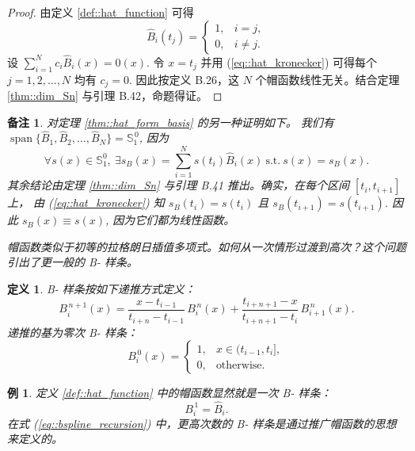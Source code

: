 \documentclass[a4paper]{ctexart}
\newtheorem{remark}{备注}
\newtheorem{definition}[theorem]{定义} %
\newtheorem{example}[theorem]{例}
\numberwithin{theorem}{section}
\numberwithin{equation}{section}
\numberwithin{figure}{section}
\numberwithin{remark}{section}
\begin{document}
\begin{proof}
由定义 \ref{def::hat_function} 可得
\begin{equation}
\label{eq::hat_kronecker}
\hat{B}_i(t_j)=
\begin{cases}
1, & i=j,\\
0, & i\ne j.
\end{cases}
\end{equation}
设 $\sum_{i=1}^{N} c_i \hat{B}_i(x)=0(x)$. 
令 $x=t_j$ 并用 (\ref{eq::hat_kronecker}) 可得每个 $j=1,2,\ldots,N$ 均有 $c_j=0$.
因此按定义 B.26，这 $N$ 个帽函数线性无关。结合定理 \ref{thm::dim_Sn} 与引理 B.42，命题得证。
\end{proof}

\begin{remark}
    \label{rem::alt_proof_hat_basis}
对定理 \ref{thm::hat_form_basis} 的另一种证明如下。
我们有 $\operatorname{span}\{\hat{B}_1,\hat{B}_2,\ldots,\hat{B}_N\}=\mathbb{S}^{\,0}_{1}$, 因为
\[
\forall s(x)\in \mathbb{S}^{0}_{1},\ \exists s_B(x)=\sum_{i=1}^{N} s(t_i)\hat{B}_i(x)\ \text{s.t.}\ s(x)=s_B(x).
\]
其余结论由定理 \ref{thm::dim_Sn} 与引理 B.41 推出。确实，在每个区间 $[t_i,t_{i+1}]$ 上，
由 (\ref{eq::hat_kronecker}) 知 $s_B(t_i)=s(t_i)$ 且 $s_B(t_{i+1})=s(t_{i+1})$. 因此 $s_B(x)\equiv s(x)$, 
因为它们都为线性函数。

帽函数类似于初等的拉格朗日插值多项式。如何从一次情形过渡到高次？这个问题引出了更一般的 B- 样条。
\end{remark}

\begin{definition}
    \label{def::bspline_recursive}
B- 样条按如下递推方式定义：
\begin{equation}
\label{eq::bspline_recursion}
B^{\,n+1}_i(x)=
\frac{x-t_{i-1}}{t_{i+n}-t_{i-1}}\,B^{\,n}_i(x)
+\frac{t_{i+n+1}-x}{t_{i+n+1}-t_i}\,B^{\,n}_{i+1}(x).
\end{equation}
递推的基为零次 B- 样条：
\begin{equation}
\label{eq::bspline_degree0}
B^{\,0}_i(x)=
\begin{cases}
1, & x\in(t_{i-1},t_i],\\
0, & \text{otherwise}.
\end{cases}
\end{equation}
\end{definition}

\begin{example}
    \label{ex::hat_is_degree1_bspline}
定义 \ref{def::hat_function} 中的帽函数显然就是一次 B- 样条：
\begin{equation}
\label{eq::B1_equals_hat}
B^{\,1}_i=\hat{B}_i.
\end{equation}
在式 (\ref{eq::bspline_recursion}) 中，更高次数的 B- 样条是通过推广帽函数的思想来定义的。
\end{example}
\end{document}
